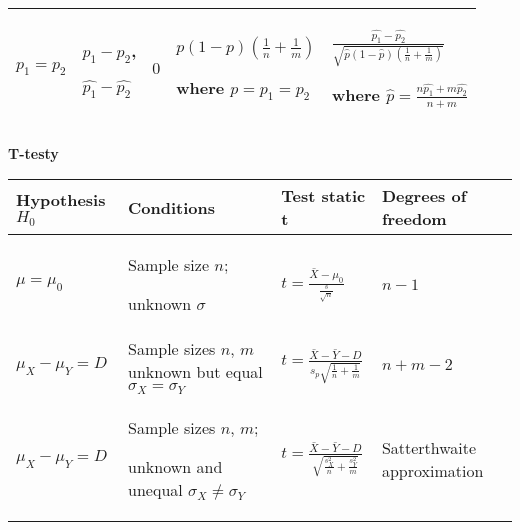 \documentclass[a4paper]{article}
\begin{document}
\begin{table}[H]
\begin{center}
\begin{tabular}{ p{2.5cm} |p{2.5cm} |p{1.5cm} |p{4cm} |p{4cm}}
                \cmidrule(r){1-5}

                $p_1 = p_2$ & $p_1 - p_2$,

                $\hat{p_1} - \hat{p_2}$ & $0$ & $p(1-p)(\frac{1}{n} + \frac{1}{m})$

                where $p = p_1 = p_2$ & $\frac{\hat{p_1} - \hat{p_2}}{\sqrt{\hat{p}(1-\hat{p})(\frac{1}{n} + \frac{1}{m})}}$

                where $\hat{p} = \frac{n\hat{p_1} + m\hat{p_2}}{n + m}$\\
                \bottomrule
            \end{tabular}
        \end{center}
    \end{table}

    \textbf{T-testy}

    \begin{table}[H]
        \begin{center}
            \begin{tabular}{ p{} |p{} |p{} |p{}}
                \toprule
                Hypothesis $H_0$ & Conditions & Test static t & Degrees of freedom\\
                \toprule

                $\mu = \mu_0$ & Sample size $n$;

                unknown $\sigma$ & $t = \frac{\bar{X} - \mu_0}{\frac{s}{\sqrt{n}}}$ & $n-1$\\

                \cmidrule(r){1-4}

                $\mu_X - \mu_Y = D$ & Sample sizes $n$, $m$
                unknown but equal $\sigma_X = \sigma_Y$ & $t = \frac{\bar{X} - \bar{Y} - D}{s_p\sqrt{\frac{1}{n}+\frac{1}{m}}}$
                & $n+m-2$\\

                \cmidrule(r){1-4}

                $\mu_X - \mu_Y = D$ & Sample sizes $n$, $m$;

                unknown and unequal $\sigma_X \neq \sigma_Y$ & $t = \frac{\bar{X} - \bar{Y} - D}{\sqrt{\frac{s_X^2}{n} + \frac{s_Y^2}{m}}}$
                & Satterthwaite approximation\\

                \bottomrule
            \end{tabular}
        \end{center}
    \end{table}
\end{document}
